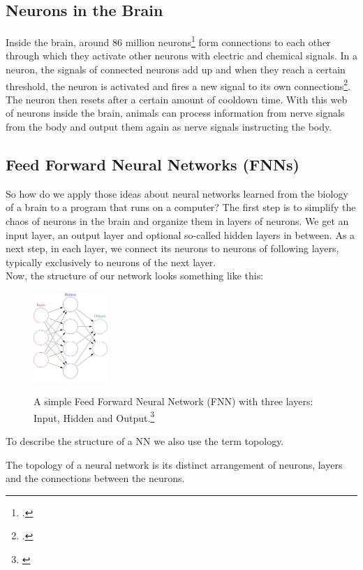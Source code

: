 \documentclass[11pt]{report}
\newcommand{\mydeflabel}{}
\newenvironment{mydef}[1]
 {\renewcommand\mydeflabel{#1}\begin{mydefinner}}
 {\end{mydefinner}}
\begin{document}
            \subsection{Neurons in the Brain}\label{subsec:neurons-in-the-brain}
    Inside the brain, around 86 million neurons\footcite{caruso_23} form connections to each other through which they activate other neurons with electric and chemical signals.
    In a neuron, the signals of connected neurons add up and when they reach a certain threshold, the neuron is activated and fires a new signal to its own connections\footcite{Newman_23}.
    The neuron then resets after a certain amount of cooldown time.
    With this web of neurons inside the brain, animals can process information from nerve signals from the body and output them again as nerve signals instructing the body.
            \subsection{Feed Forward Neural Networks (FNNs)}\label{subsec:feed-forward-neural-networks-(fnns)}
    So how do we apply those ideas about neural networks learned from the biology of a brain to a program that runs on a computer?
    The first step is to simplify the chaos of neurons in the brain and organize them in layers of neurons.
    We get an input layer, an output layer and optional so-called hidden layers in between.
    As a next step, in each layer, we connect its neurons to neurons of following layers, typically exclusively to neurons of the next layer.
    \\
    Now, the structure of our network looks something like this:
    \begin{figure}[H]
        \centering
        \includegraphics[width=0.25\textwidth]{nn_simple_1}~\caption{A simple Feed Forward Neural Network (FNN) with three layers: Input, Hidden and Output.\footnote{\cite{nn_simple_img_1}}}
        \label{fig:nn_simple_1}
    \end{figure}
    \noindent
    To describe the structure of a NN we also use the term topology.
    \begin{mydef}{Neural Network Topology}
        The topology of a neural network is its distinct arrangement of neurons, layers and the connections between the neurons.
        \label{definition:Topology}
    \end{mydef}
\end{document}
